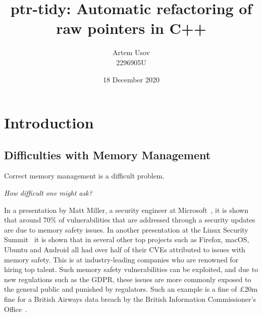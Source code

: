 \documentclass{proposal}
\begin{document}




    \title{ptr-tidy: Automatic refactoring of raw pointers in C++}
    \author{Artem Usov\\ 2296905U}
    \date{18 December 2020}
    \maketitle
    \tableofcontents
    \newpage




    \section{Introduction}\label{sec:intro}

    \subsection{Difficulties with Memory Management}\label{subsec:difficulties-with-memory-management}


    Correct memory management is a difficult problem.

    \emph{How difficult one might ask?}

    In a presentation by Matt Miller, a security engineer at Microsoft~\cite{Miller2019}, it is shown that around 70\% of vulnerabilities that are addressed through a security updates are due to memory safety issues.
    In another presentation at the Linux Security Summit~\cite{Gaynor2020} it is shown that in several other top projects such as Firefox, macOS, Ubuntu and Android all had over half of their CVEs attributed to issues with memory safety.
    This is at industry-leading companies who are renowned for hiring top talent.
    Such memory safety vulnerabilities can be exploited, and due to new regulations such as the GDPR, these issues are more commonly exposed to the general public and punished by regulators.
    Such an example is a fine of £20m fine for a British Airways data breach by the British Information Commissioner's Office~\cite{ICO2020}.
\end{document}
